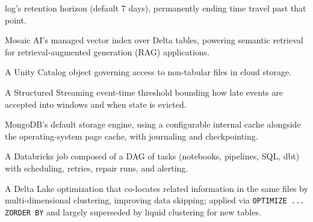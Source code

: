 \begin{description}
    log's retention horizon (default 7 days), permanently ending time travel past that point.
  \item[Vector Search] Mosaic AI's managed vector index over Delta tables, powering semantic retrieval
    for retrieval-augmented generation (RAG) applications.
  \item[Volume] A Unity Catalog object governing access to non-tabular files in cloud storage.
  \item[Watermark] A Structured Streaming event-time threshold bounding how late events are accepted
    into windows and when state is evicted.
  \item[WiredTiger] MongoDB's default storage engine, using a configurable internal cache alongside the
    operating-system page cache, with journaling and checkpointing.
  \item[Workflow] A Databricks job composed of a DAG of tasks (notebooks, pipelines, SQL, dbt) with
    scheduling, retries, repair runs, and alerting.
  \item[Z-ordering] A Delta Lake optimization that co-locates related information in the same files by
    multi-dimensional clustering, improving data skipping; applied via \texttt{OPTIMIZE ... ZORDER BY}
    and largely superseded by liquid clustering for new tables.
\end{description}
